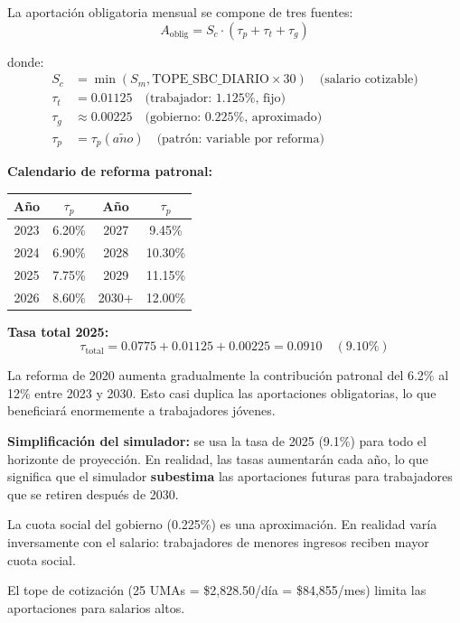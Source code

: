 \documentclass[11pt,a4paper]{report}
\theoremstyle{remark}
\begin{document}
\begin{tcolorbox}[colback=blue!5!white, colframe=blue!75!black, title=\textbf{Definici\'on Formal}]
La aportaci\'on obligatoria mensual se compone de tres fuentes:
\begin{equation}
A_{\text{oblig}} = S_c \cdot (\tau_p + \tau_t + \tau_g)
\label{eq:aport_oblig}
\end{equation}

donde:
\begin{align}
S_c &= \min(S_m, \text{TOPE\_SBC\_DIARIO} \times 30) \quad \text{(salario cotizable)} \\
\tau_t &= 0.01125 \quad \text{(trabajador: 1.125\%, fijo)} \\
\tau_g &\approx 0.00225 \quad \text{(gobierno: 0.225\%, aproximado)} \\
\tau_p &= \tau_p(a\tilde{n}o) \quad \text{(patr\'on: variable por reforma)}
\end{align}

\textbf{Calendario de reforma patronal:}
\begin{center}
\begin{tabular}{cc|cc}
\toprule
A\~no & $\tau_p$ & A\~no & $\tau_p$ \\
\midrule
2023 & 6.20\% & 2027 & 9.45\% \\
2024 & 6.90\% & 2028 & 10.30\% \\
2025 & 7.75\% & 2029 & 11.15\% \\
2026 & 8.60\% & 2030+ & 12.00\% \\
\bottomrule
\end{tabular}
\end{center}

\textbf{Tasa total 2025:}
\begin{equation}
\tau_{\text{total}} = 0.0775 + 0.01125 + 0.00225 = 0.0910 \quad (9.10\%)
\end{equation}
\end{tcolorbox}

\begin{tcolorbox}[colback=green!5!white, colframe=green!50!black, title=\textbf{Intuici\'on}]
La reforma de 2020 aumenta gradualmente la contribuci\'on patronal del 6.2\% al 12\% entre 2023 y 2030. Esto casi duplica las aportaciones obligatorias, lo que beneficiar\'a enormemente a trabajadores j\'ovenes.

\textbf{Simplificaci\'on del simulador:} se usa la tasa de 2025 (9.1\%) para todo el horizonte de proyecci\'on. En realidad, las tasas aumentar\'an cada a\~no, lo que significa que el simulador \textbf{subestima} las aportaciones futuras para trabajadores que se retiren despu\'es de 2030.

La cuota social del gobierno (0.225\%) es una aproximaci\'on. En realidad var\'ia inversamente con el salario: trabajadores de menores ingresos reciben mayor cuota social.

El tope de cotizaci\'on (25 UMAs = \$2,828.50/d\'ia = \$84,855/mes) limita las aportaciones para salarios altos.
\end{tcolorbox}
\end{document}
